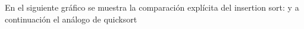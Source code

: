 \documentclass[article,a4paper]{article}
\begin{document}
En el siguiente gráfico se muestra la comparación explícita del insertion sort:
y a continuación el análogo de quicksort

\end{document}

